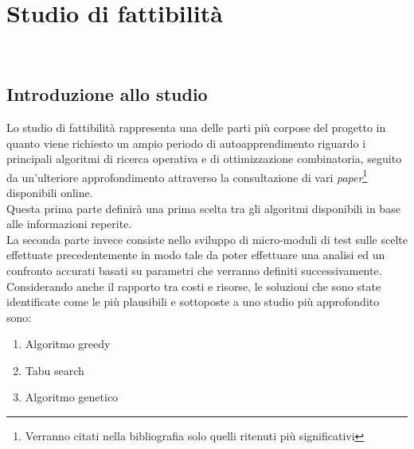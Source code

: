 
\chapter{Studio di fattibilità}
\label{cap:studio-fattibilita}

\noindent {}\\

\section{Introduzione allo studio}
\noindent Lo studio di fattibilità rappresenta una delle parti più corpose
del progetto in quanto viene richiesto un ampio periodo di autoapprendimento
riguardo i principali algoritmi di ricerca operativa e di ottimizzazione combinatoria,
seguito da un'ulteriore approfondimento attraverso la consultazione di vari \textit{paper}\footnote[2]{Verranno citati nella bibliografia solo quelli ritenuti più significativi}
disponibili online.\\

\noindent Questa prima parte definirà una prima scelta tra gli algoritmi disponibili in base alle informazioni reperite.\\

\noindent La seconda parte invece consiste nello sviluppo di micro-moduli di test sulle scelte effettuate
precedentemente in modo tale da poter effettuare una analisi ed un confronto accurati basati su parametri che verranno
definiti successivamente.\\

\noindent Considerando anche il rapporto tra costi e risorse, le soluzioni che sono state identificate come le più plausibili e sottoposte a uno studio più approfondito sono:
\begin{enumerate}
    \item Algoritmo greedy
    \item Tabu search
    \item Algoritmo genetico
\end{enumerate}


